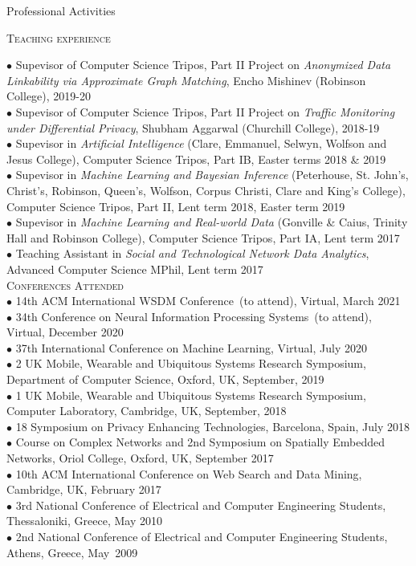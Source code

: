 \documentclass[11pt]{resume}
\begin{document}
\begin{category}{Professional Activities} 

\citemnobullet 
\textsc{Teaching experience}

{$\bullet$  Supevisor of Computer Science Tripos, Part II Project on \emph{Anonymized Data Linkability via Approximate Graph Matching}, Encho Mishinev (Robinson College), 2019-20}\\
{$\bullet$  Supevisor of Computer Science Tripos, Part II Project on \emph{Traffic Monitoring under Differential Privacy}, Shubham Aggarwal (Churchill College), 2018-19}\\
{$\bullet$  Supevisor in \emph{Artificial Intelligence} (Clare, Emmanuel, Selwyn, Wolfson and Jesus College), Computer Science Tripos, Part IB, Easter terms 2018 \& 2019}\\
{$\bullet$  Supevisor in \emph{Machine Learning and Bayesian Inference} (Peterhouse, St. John's, Christ's, Robinson, Queen's, Wolfson, Corpus Christi, Clare and King's College), Computer Science Tripos, Part II, Lent term 2018, Easter term 2019}\\
{$\bullet$  Supevisor in \emph{Machine Learning and Real-world Data} (Gonville \& Caius, Trinity Hall and Robinson College), Computer Science Tripos, Part IA, Lent term 2017}\\
{$\bullet$ Teaching Assistant in \emph{Social and Technological Network Data Analytics}, Advanced Computer Science MPhil, Lent term 2017}\\


\citemnobullet 
\textsc{Conferences Attended}\\
$\bullet$ 14th ACM International WSDM Conference~(to attend), Virtual, March 2021\\
$\bullet$ 34th Conference on Neural Information Processing Systems~(to attend), Virtual, December 2020\\
$\bullet$ 37th International Conference on Machine Learning, Virtual, July 2020\\
$\bullet$ 2 UK Mobile, Wearable and Ubiquitous Systems Research Symposium, Department of Computer Science, Oxford, UK, September, 2019\\
$\bullet$ 1 UK Mobile, Wearable and Ubiquitous Systems Research Symposium, Computer Laboratory, Cambridge, UK, September, 2018\\
$\bullet$ 18 Symposium on Privacy Enhancing Technologies, Barcelona, Spain, July 2018\\
$\bullet$ Course on Complex Networks and 2nd Symposium on Spatially Embedded Networks,  Oriol College, Oxford, UK, September 2017\\
$\bullet$ 10th ACM International Conference on Web Search and Data Mining, Cambridge, UK, February 2017\\
$\bullet$ 3rd National Conference of Electrical and Computer Engineering Students, Thessaloniki, Greece, May 2010\\
$\bullet$ 2nd National Conference of Electrical and Computer Engineering Students, Athens, Greece, \mbox{May 2009} \\


\end{category}
\end{document}
